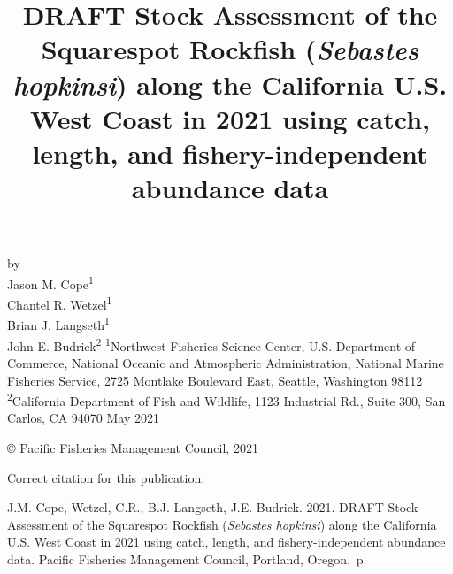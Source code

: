 \documentclass[11pt,
  english,
  a4paper,
]{article}
\date{}
\newcommand{\trTitle}{DRAFT Stock Assessment of the Squarespot Rockfish (\emph{Sebastes hopkinsi}) along the California U.S. West Coast in 2021 using catch, length, and fishery-independent abundance data}
\newcommand{\trYear}{2021}
\newcommand{\trMonth}{May}
\newcommand{\trAuthsBack}{J.M. Cope, Wetzel, C.R., B.J. Langseth, J.E. Budrick}
\newcommand{\trCitation}{
\begin{hangparas}{1em}{1}
\trAuthsBack{}. \trYear{}. \trTitle{}. Pacific Fisheries Management Council, Portland, Oregon. \pageref{LastPage}{}\,p.
\end{hangparas}}
\begin{document}

\renewcommand*{\thefootnote}{\fnsymbol{footnote}}

\small
\thispagestyle{empty}
\noindent
\begin{center}
\title{DRAFT Stock Assessment of the Squarespot Rockfish (\emph{Sebastes hopkinsi}) along the California U.S. West Coast in 2021 using catch, length, and fishery-independent abundance data}
\vspace{1.5cm}
{\Large\textbf{}}
\vfill
by\\
Jason M. Cope\textsuperscript{1}\\
Chantel R. Wetzel\textsuperscript{1}\\
Brian J. Langseth\textsuperscript{1}\\
John E. Budrick\textsuperscript{2}\vfill
\textsuperscript{1}Northwest Fisheries Science Center, U.S. Department of Commerce, National Oceanic and Atmospheric Administration, National Marine Fisheries Service, 2725 Montlake Boulevard East, Seattle, Washington 98112\\
\textsuperscript{2}California Department of Fish and Wildlife, 1123 Industrial Rd., Suite 300, San Carlos, CA 94070\vfill
\trMonth{} \trYear{}
\end{center}
\clearpage

\thispagestyle{empty}
\vspace*{\fill}
\begin{center}
\copyright{} Pacific Fisheries Management Council, \trYear{}\\
\end{center}
\par
\bigskip
\noindent
Correct citation for this publication:
\bigskip
\par
\trCitation{}
\clearpage


\tableofcontents\clearpage
\label{TRlastRoman}
\clearpage

\newpage
\thispagestyle{empty} %
\end{document}

